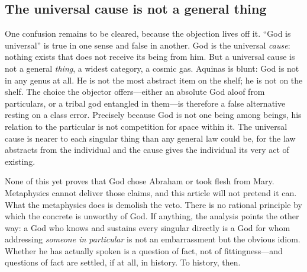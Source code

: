 \subsection{The universal cause is not a general thing}

One confusion remains to be cleared, because the objection lives off it. ``God is universal'' is true in one sense and false in another. God is the universal \emph{cause}: nothing exists that does not receive its being from him. But a universal cause is not a general \emph{thing}, a widest category, a cosmic gas. Aquinas is blunt: God is not in any genus at all. He is not the most abstract item on the shelf; he is not on the shelf. The choice the objector offers---either an absolute God aloof from particulars, or a tribal god entangled in them---is therefore a false alternative resting on a class error. Precisely because God is not one being among beings, his relation to the particular is not competition for space within it. The universal cause is nearer to each singular thing than any general law could be, for the law abstracts from the individual and the cause gives the individual its very act of existing.

None of this yet proves that God chose Abraham or took flesh from Mary. Metaphysics cannot deliver those claims, and this article will not pretend it can. What the metaphysics does is demolish the veto. There is no rational principle by which the concrete is unworthy of God. If anything, the analysis points the other way: a God who knows and sustains every singular directly is a God for whom addressing \emph{someone in particular} is not an embarrassment but the obvious idiom. Whether he has actually spoken is a question of fact, not of fittingness---and questions of fact are settled, if at all, in history. To history, then.
